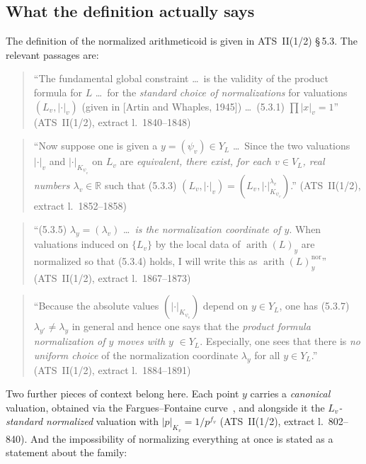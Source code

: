 \documentclass[11pt,a4paper]{article}
\theoremstyle{definition}
\theoremstyle{plain}
\theoremstyle{definition}
\newcommand{\arith}{\operatorname{arith}}
\newcommand{\Ynum}{Y_L}
\newcommand{\anchor}[2]{(#1, extract l.~#2)}
\begin{document}
\subsection{What the definition actually says}

The definition of the normalized arithmeticoid is given in ATS~II(1/2)
\S\,5.3. The relevant passages are:

\begin{quote}\small
``The fundamental global constraint \ldots\ is the validity of the product formula
for $L$ \ldots\ for the \emph{standard choice of normalizations} for valuations
$(L_v, |\cdot|_v)$ (given in [Artin and Whaples, 1945]) \ldots\ (5.3.1)
$\prod |x|_v = 1$'' \hfill\anchor{ATS~II(1/2)}{1840--1848}
\end{quote}

\begin{quote}\small
``Now suppose one is given a $y = (\psi_v) \in \Ynum$ \ldots\ Since the two
valuations $|\cdot|_v$ and $|\cdot|_{K_{\psi_v}}$ on $L_v$ are \emph{equivalent,
there exist, for each $v \in V_L$, real numbers $\lambda_v \in \mathbb{R}$} such
that (5.3.3) $(L_v, |\cdot|_v) = (L_v, |\cdot|^{\lambda_v}_{K_{\psi_v}})$.''
\hfill\anchor{ATS~II(1/2)}{1852--1858}
\end{quote}

\begin{quote}\small
``(5.3.5) $\lambda_y = (\lambda_v)$ \ldots\ \emph{is the normalization coordinate
of $y$}. When valuations induced on $\{L_v\}$ by the local data of $\arith(L)_y$
are normalized so that (5.3.4) holds, I will write this as
$\arith(L)^{\mathrm{nor}}_y$'' \hfill\anchor{ATS~II(1/2)}{1867--1873}
\end{quote}

\begin{quote}\small
``Because the absolute values $(|\cdot|_{K_{\psi_v}})$ depend on $y \in \Ynum$,
one has (5.3.7) $\lambda_{y'} \neq \lambda_y$ in general and hence one says that
the \emph{product formula normalization of $y$ moves with $y$} $\in \Ynum$.
Especially, one sees that there is \emph{no uniform choice} of the normalization
coordinate $\lambda_y$ for all $y \in \Ynum$.''
\hfill\anchor{ATS~II(1/2)}{1884--1891}
\end{quote}

Two further pieces of context belong here. Each point $y$ carries a
\emph{canonical} valuation, obtained via the Fargues--Fontaine curve~\cite{FarguesFontaine2018},
and alongside it the \emph{$L_v$-standard normalized}
valuation with $|p|_{K_v} = 1/p^{f_v}$ \anchor{ATS~II(1/2)}{802--840}. And the
impossibility of normalizing everything at once is stated as a statement about the
family:
\end{document}
